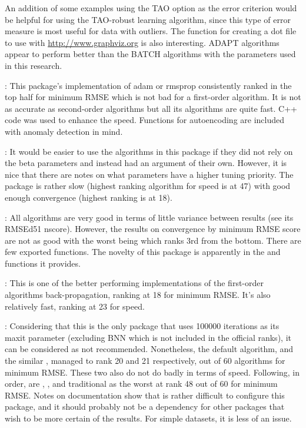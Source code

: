 An addition of some examples using the TAO option as the error criterion
would be helpful for using the TAO-robust learning algorithm, since this
type of error measure is most useful for data with outliers. The
function for creating a dot file to use with
\url{http://www.graphviz.org} is also interesting. ADAPT algorithms
appear to perform better than the BATCH algorithms with the parameters
used in this research.

 \citep{R-ANN2}: This package's implementation of adam or
rmsprop consistently ranked in the top half for minimum RMSE which is
not bad for a first-order algorithm. It is not as accurate as
second-order algorithms but all its algorithms are quite fast. C++ code
was used to enhance the speed. Functions for autoencoding are included
with anomaly detection in mind.

 \citep{R-automl}: It would be easier to use the
algorithms in this package if they did not rely on the beta parameters
and instead had an argument of their own. However, it is nice that there
are notes on what parameters have a higher tuning priority. The package
is rather slow (highest ranking algorithm for speed is  at
47) with good enough convergence (highest ranking is  at 18).

 \citep{R-deepdive}: All algorithms are very good in terms
of little variance between results (see its RMSEd51 nscore). However,
the results on convergence by minimum RMSE score are not as good with
the worst being  which ranks 3rd from the bottom.
There are few exported functions. The novelty of this package is
apparently in the  and  functions it
provides.

 \citep{R-deepnet}: This is one of the better
performing implementations of the first-order algorithms
back-propagation, ranking at 18 for minimum RMSE. It's also relatively
fast, ranking at 23 for speed.

 \citep{R-neuralnet}: Considering that this is the
only package that uses 100000 iterations as its maxit parameter
(excluding BNN which is not included in the official ranks), it can be
considered as not recommended. Nonetheless, the default algorithm,
 and the similar , managed to rank 20 and 21
respectively, out of 60 algorithms for minimum RMSE. These two also do
not do badly in terms of speed. Following, in order, are ,
, and traditional  as the worst at rank 48 out
of 60 for minimum RMSE. Notes on documentation show that is rather
difficult to configure this package, and it should probably not be a
dependency for other packages that wish to be more certain of the
results. For simple datasets, it is less of an issue.

